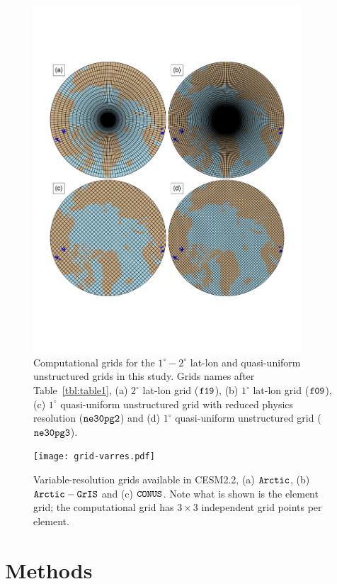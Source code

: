 \documentclass[draft]{agujournal2019}
\begin{document}
\begin{figure}[t]
\begin{center}
         \includegraphics[width=100mm]{grid-uniform}
\end{center}
\caption{Computational grids for the $1^{\circ}-2^{\circ}$ lat-lon and quasi-uniform unstructured grids in this study. Grids names after Table~\ref{tbl:table1}, (a) $2^{\circ}$ lat-lon grid ($\tt f19$), (b) $1^{\circ}$ lat-lon grid ($\tt f09$), (c) $1^{\circ}$ quasi-uniform unstructured grid with reduced physics resolution ($\tt ne30pg2$) and (d) $1^{\circ}$ quasi-uniform unstructured grid ($\tt ne30pg3$).}
\label{fig:uni-grids}
\end{figure}

\begin{figure}[t]
\begin{center}
         \texttt{[image: grid-varres.pdf]}
\end{center}
\caption{Variable-resolution grids available in CESM2.2, (a) $\tt Arctic$, (b) $\tt Arctic-GrIS$ and (c) $\tt CONUS$. Note what is shown is the element grid; the computational grid has $3\times3$ independent grid points per element.}
\label{fig:vr-grids}
\end{figure}

\section{Methods}\label{sec:methods}
\end{document}
